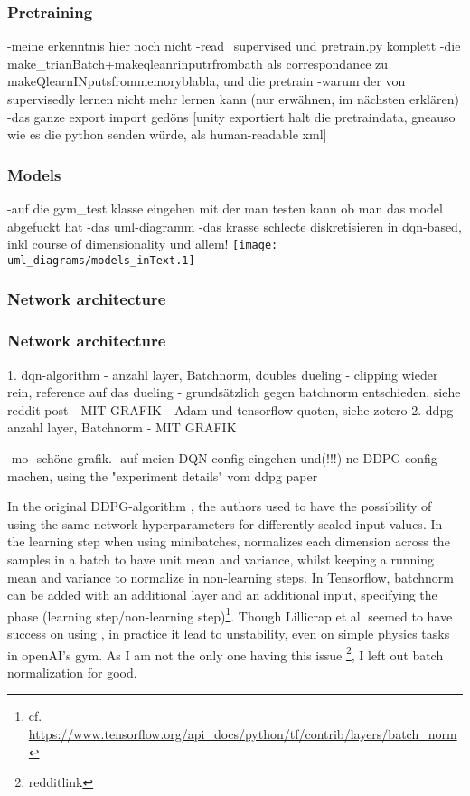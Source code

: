 \subsubsection{Pretraining}

-meine erkenntnis hier noch nicht
-read_supervised und pretrain.py komplett 
-die make_trianBatch+makeqleanrinputrfrombath als correspondance zu makeQlearnINputsfrommemoryblabla, und die pretrain
-warum der von supervisedly lernen nicht mehr lernen kann (nur erwähnen, im nächsten erklären)
-das ganze export import gedöns [unity exportiert halt die pretraindata, gneauso wie es die python senden würde, als human-readable xml]

\subsubsection{Models}

-auf die gym_test klasse eingehen mit der man testen kann ob man das model abgefuckt hat
-das uml-diagramm
-das krasse schlecte diskretisieren in dqn-based, inkl course of dimensionality und allem!
\texttt{[image: uml\_diagrams/models\_inText.1]}

\subsubsection{Network architecture}




\subsubsection{Network architecture}

1. dqn-algorithm
- anzahl layer, Batchnorm, doubles dueling
- clipping wieder rein, reference auf das dueling
- grundsätzlich gegen batchnorm entschieden, siehe reddit post
- MIT GRAFIK
- Adam und tensorflow quoten, siehe zotero
2. ddpg
- anzahl layer, Batchnorm
- MIT GRAFIK

-mo
-schöne grafik.
-auf meien DQN-config eingehen und(!!!) ne DDPG-config machen, using the "experiment details" vom ddpg paper  


In the original DDPG-algorithm \cite{lillicrap_continuous_2015}, the authors used  \cite{ioffe_batch_2015} to have the possibility of using the same network hyperparameters for differently scaled input-values. In the learning step when using minibatches, \batchnorm normalizes each dimension across the samples in a batch to have unit mean and variance, whilst keeping a running mean and variance to normalize in non-learning steps. In Tensorflow, batchnorm can be added with an additional layer and an additional input, specifying the phase (learning step/non-learning step)\footnote{cf. \url{https://www.tensorflow.org/api\_docs/python/tf/contrib/layers/batch_norm}}. Though Lillicrap et al. seemed to have success on using \batchnorm, in practice it lead to unstability, even on simple physics tasks in openAI's gym. As I am not the only one having this issue \footnote{redditlink}, I left out batch normalization for good.


